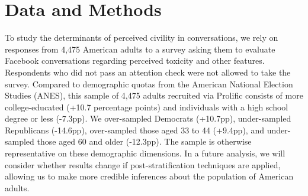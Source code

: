 \documentclass{article}
\begin{document}



\section{Data and Methods}

To study the determinants of perceived civility in conversations, we rely on responses from 4,475 American adults to a survey asking them to evaluate Facebook conversations regarding perceived toxicity and other features. Respondents who did not pass an attention check were not allowed to take the survey. Compared to demographic quotas from the American National Election Studies (ANES), this sample of 4,475 adults recruited via Prolific consists of more college-educated (+10.7 percentage points) and individuals with a high school degree or less (-7.3pp). We over-sampled Democrats (+10.7pp), under-sampled Republicans (-14.6pp), over-sampled those aged 33 to 44 (+9.4pp), and under-sampled those aged 60 and older (-12.3pp). The sample is otherwise representative on these demographic dimensions. In a future analysis, we will consider whether results change if post-stratification techniques are applied, allowing us to make more credible inferences about the population of American adults.
\end{document}
